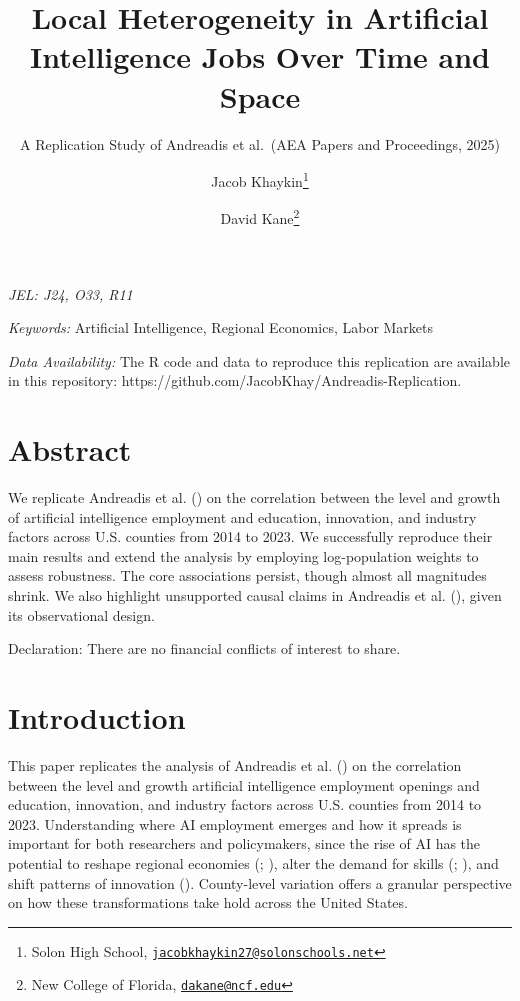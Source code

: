 \documentclass[
]{article}
\title{Local Heterogeneity in Artificial Intelligence Jobs Over Time and
Space}
\subtitle{A Replication Study of Andreadis et al.~(AEA Papers and
Proceedings, 2025)}
\author{Jacob Khaykin\footnote{Solon High School,
  \href{mailto:jacobkhaykin27@solonschools.net}{\nolinkurl{jacobkhaykin27@solonschools.net}}} \and David
Kane\footnote{New College of Florida,
  \href{mailto:dakane@ncf.edu}{\nolinkurl{dakane@ncf.edu}}}}
\date{}
\begin{document}
\maketitle


\emph{JEL: J24, O33, R11}

\emph{Keywords:} Artificial Intelligence, Regional Economics, Labor
Markets

\emph{Data Availability:} The R code and data to reproduce this
replication are available in this repository:
https://github.com/JacobKhay/Andreadis-Replication.

\section*{Abstract}\label{abstract}

We replicate Andreadis et al. () on
the correlation between the level and growth of artificial intelligence
employment and education, innovation, and industry factors across U.S.
counties from 2014 to 2023. We successfully reproduce their main results
and extend the analysis by employing log-population weights to assess
robustness. The core associations persist, though almost all magnitudes
shrink. We also highlight unsupported causal claims in Andreadis et al.
(), given its observational design.

Declaration: There are no financial conflicts of interest to share.

\newpage

\section{Introduction}\label{introduction}

This paper replicates the analysis of Andreadis et al.
() on the correlation between the
level and growth artificial intelligence employment openings and
education, innovation, and industry factors across U.S. counties from
2014 to 2023. Understanding where AI employment emerges and how it
spreads is important for both researchers and policymakers, since the
rise of AI has the potential to reshape regional economies
(;
), alter the demand for skills
(;
), and shift patterns of innovation
(). County-level variation
offers a granular perspective on how these transformations take hold
across the United States.
\end{document}
